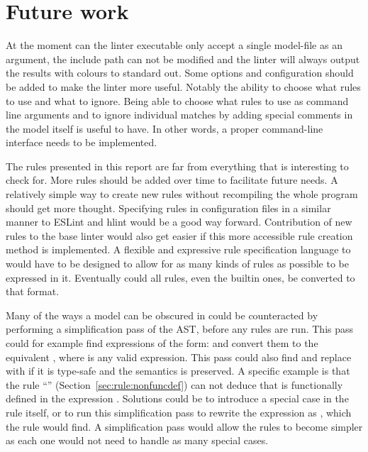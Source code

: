 \documentclass[a4paper,12pt]{article}
\newcommand{\ruleref}[1]{``\nameref{sec:rule:#1}'' (Section~\ref{sec:rule:#1})}
\begin{document}
\section{Future work}
At the moment can the linter executable only accept a single model-file as an argument,
the include path can not be modified and the linter will always output the results with
colours to standard out.
Some options and configuration should be added to make the linter more useful. Notably
the ability to choose what rules to use and what to ignore. Being able to choose what
rules to use as command line arguments and to ignore individual matches by adding special
comments in the model itself is useful to have. In other words, a proper command-line
interface needs to be implemented.

The rules presented in this report are far from everything that is interesting to check
for. More rules should be added over time to facilitate future needs. A relatively simple
way to create new rules without recompiling the whole program should get more thought.
Specifying rules in configuration files in a similar manner to ESLint and hlint would be a
good way forward. Contribution of new rules to the base linter would also get easier if
this more accessible rule creation method is implemented. A flexible and expressive rule
specification language to would have to be designed to allow for as many kinds of rules as
possible to be expressed in it. Eventually could all rules, even the builtin ones, be
converted to that format.

Many of the ways a model can be obscured in could be counteracted by performing a
simplification pass of the AST, before any rules are run. This pass could for example find
expressions of the form:  and convert them to the equivalent , where
 is any valid expression. This pass could also find \mi{[a]} and replace with 
if it is type-safe and the semantics is preserved. A specific example is that the rule
\ruleref{nonfuncdef} can not deduce that  is functionally defined in the expression
\mi{[a] = [b+1]}. Solutions could be to introduce a special case in the rule itself, or to
run this simplification pass to rewrite the expression as , which the rule
would find. A simplification pass would allow the rules to become simpler as each one
would not need to handle as many special cases.


%

\end{document}
